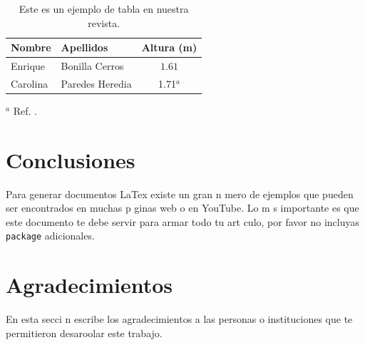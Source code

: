 \documentclass{article}
\begin{document}
\begin{table}[h]
\caption{Este es un ejemplo de tabla en nuestra revista.}
\label{tab:uno}
\begin{center}
\begin{tabular}{l|l|c}
\hline\hline
Nombre      &   Apellidos       &   Altura (m)\\
\hline
Enrique     &   Bonilla Cerros  &   $1.61$ \\
Carolina    &   Paredes Heredia &   1.71$^a$\\
\hline\hline
\end{tabular}
\end{center}
$^a$ Ref. \cite{1973_MEP_1}.
\end{table}

\section{Conclusiones}
Para generar documentos LaTex existe un gran n mero de ejemplos que pueden ser encontrados en muchas p ginas web o en YouTube. Lo m s importante es que este documento te debe servir para armar todo tu art culo, por favor no incluyas \texttt{package} adicionales.

\section*{Agradecimientos}
En esta secci n escribe los agradecimientos a las personas o instituciones que te permitieron desaroolar este trabajo.
\end{document}
